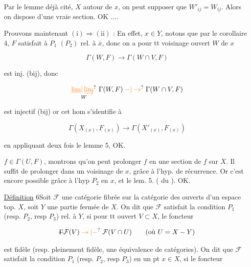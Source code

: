 Par le lemme  déjà cité,  $X$  autour de $x$, on peut supposer que $W'_{ij}=W_{ij}$. Alors on dispose d'une vraie section. OK ....


Prouvons maintenant $(\mathrm{i})\Rightarrow(\mathrm{ii})$ : En effet,  $x\in Y$,  notons que par le  corollaire 4, $F$ satisfait à $P_1$ $(P_2)$ rel. à $\overline x$, donc  on a pour tt voisinage ouvert $W$ de $x$

\[
\Gamma(W,F)\longrightarrow\Gamma(W\cap V,F)
\]

est inj. (bij), donc

\[
\underset{W}{\unsure{\underline{\lim}|\varinjlim}}\ \Gamma(W,F)\mathrel{\unsure{-|\to}}\Gamma(W\cap V,F)
\]

est injectif (bij) or cet hom s'identifie à

\[
\Gamma(X_{(x)},F_{(x)})\longrightarrow\Gamma(X'_{(x)},F_{(x)})
\]

en appliquant deux fois le lemme 5, OK.


$f\in\Gamma(U,F)$, montrons qu'on peut prolonger $f$ en une section de $f$ sur $X$. Il suffit de prolonger dans un voisinage de $x$, grâce à l'hyp. de récurrence. Or c'est encore possible grâce à l'hyp $P_2$ en $x$, et le lem. 5. ( du ). OK.

\uline{Définition} 6\quad Soit $\mathcal F$ une catégorie fibrée sur la catégorie des ouverts d'un espace top. $X$, soit $Y$ une partie fermée de $X$. On dit que $\mathcal F$ satisfait la condition $P_1$  (resp. $P_2$, resp $P_3$) rel. à $Y$, si pour tt ouvert $V\subset X$, le foncteur


\[
\deleted{\Gamma}\mathcal F(V)\mathrel{\unsure{\to|-}}\mathcal F(V\cap U)\qquad(\text{où } U=X-Y)
\]

est fidèle (resp. pleinement fidèle,  une équivalence de catégories). On dit que $\mathcal F$ satisfait la condition $P_1$ (resp. $P_2$, resp $P_3$) en un pt $x\in X$, si le foncteur

